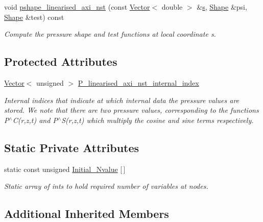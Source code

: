 \begin{DoxyCompactItemize}
void \hyperlink{classoomph_1_1LinearisedAxisymmetricQCrouzeixRaviartElement_a362d335bf1eeed38461e494645969ad1}{pshape\+\_\+linearised\+\_\+axi\+\_\+nst} (const \hyperlink{classoomph_1_1Vector}{Vector}$<$ double $>$ \&\hyperlink{cfortran_8h_ab7123126e4885ef647dd9c6e3807a21c}{s}, \hyperlink{classoomph_1_1Shape}{Shape} \&psi, \hyperlink{classoomph_1_1Shape}{Shape} \&test) const
\begin{DoxyCompactList}\small\item\em Compute the pressure shape and test functions at local coordinate s. \end{DoxyCompactList}\end{DoxyCompactItemize}
\subsection*{Protected Attributes}
\begin{DoxyCompactItemize}
\item 
\hyperlink{classoomph_1_1Vector}{Vector}$<$ unsigned $>$ \hyperlink{classoomph_1_1LinearisedAxisymmetricQCrouzeixRaviartElement_a67af2873ed8775ce5916590a932e5ec9}{P\+\_\+linearised\+\_\+axi\+\_\+nst\+\_\+internal\+\_\+index}
\begin{DoxyCompactList}\small\item\em Internal indices that indicate at which internal data the pressure values are stored. We note that there are two pressure values, corresponding to the functions P$^\wedge$C(r,z,t) and P$^\wedge$S(r,z,t) which multiply the cosine and sine terms respectively. \end{DoxyCompactList}\end{DoxyCompactItemize}
\subsection*{Static Private Attributes}
\begin{DoxyCompactItemize}
\item 
static const unsigned \hyperlink{classoomph_1_1LinearisedAxisymmetricQCrouzeixRaviartElement_a0d6c3205a5b72d828abe528491ab1311}{Initial\+\_\+\+Nvalue} \mbox{[}$\,$\mbox{]}
\begin{DoxyCompactList}\small\item\em Static array of ints to hold required number of variables at nodes. \end{DoxyCompactList}\end{DoxyCompactItemize}
\subsection*{Additional Inherited Members}


